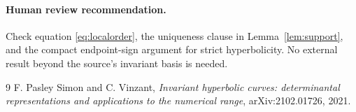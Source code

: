 \documentclass[11pt]{article}
\begin{document}
\paragraph{Human review recommendation.}
Check equation \eqref{eq:localorder}, the uniqueness clause in
Lemma~\ref{lem:support}, and the compact endpoint-sign argument for strict
hyperbolicity.  No external result beyond the source's invariant basis is
needed.

\begin{thebibliography}{9}
F. Pasley Simon and C. Vinzant,
\emph{Invariant hyperbolic curves: determinantal representations and
applications to the numerical range}, arXiv:2102.01726, 2021.
\end{thebibliography}
\end{document}
